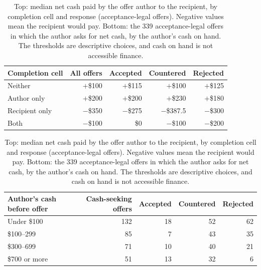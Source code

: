 \begin{table}[htbp]
\centering\small
\begin{tabular}{@{}lrrrr@{}}
\toprule
Completion cell & All offers & Accepted & Countered & Rejected\\
\midrule
Neither & $+$\$100 & $+$\$115 & $+$\$100 & $+$\$125\\
Author only & $+$\$200 & $+$\$200 & $+$\$230 & $+$\$180\\
Recipient only & $-$\$350 & $-$\$275 & $-$\$387.5 & $-$\$300\\
Both & $-$\$100 & \$0 & $-$\$100 & $-$\$200\\
\bottomrule
\end{tabular}

\medskip
\begin{tabular}{@{}lrrrr@{}}
\toprule
Author's cash before offer & Cash-seeking offers & Accepted & Countered & Rejected\\
\midrule
Under \$100 & 132 & 18 & 52 & 62\\
\$100--299 & 85 & 7 & 43 & 35\\
\$300--699 & 71 & 10 & 40 & 21\\
\$700 or more & 51 & 13 & 32 & 6\\
\bottomrule
\end{tabular}
\caption{Top: median net cash paid by the offer author to the recipient, by completion cell and response (acceptance-legal offers). Negative values mean the recipient would pay. Bottom: the 339 acceptance-legal offers in which the author asks for net cash, by the author's cash on hand. The thresholds are descriptive choices, and cash on hand is not accessible finance.}
\label{tab:app-cash}
\end{table}
